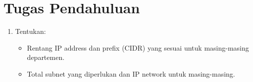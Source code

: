 \section{Tugas Pendahuluan}
\begin{enumerate}
Sebuah perusahaan baru sedang membangun jaringan internal yang akan dibagi menjadi beberapa bagian berdasarkan departemen. Setiap departemen akan memiliki jaringan lokalnya sendiri dan akan saling terhubung melalui sebuah router utama. Berikut adalah informasi mengenai jumlah perangkat yang digunakan masing-masing departemen:

\begin{itemize}
    \item Departemen Produksi: 50 perangkat
    \item Departemen Administrasi: 20 perangkat
    \item Departemen Keuangan: 10 perangkat
    \item Departemen R&D: 100 perangkat
\end{itemize}

Administrator jaringan diminta untuk:
\begin{itemize}
    \item Membuat perencanaan alokasi IP address untuk masing-masing departemen.
    \item Menentukan prefix subnet (CIDR) yang paling sesuai untuk masing-masing kebutuhan, tanpa memboroskan IP.
    \item Memastikan tidak ada overlap antar subnet.
    \item Membuat skema routing agar masing-masing jaringan bisa saling berkomunikasi melalui router, jika diperlukan.
\end{itemize}


	\item Tentukan:
    \begin{itemize}
        \item Rentang IP address dan prefix (CIDR) yang sesuai untuk masing-masing departemen.
        \item Total subnet yang diperlukan dan IP network untuk masing-masing.
    \end{itemize}
    

\end{enumerate}
